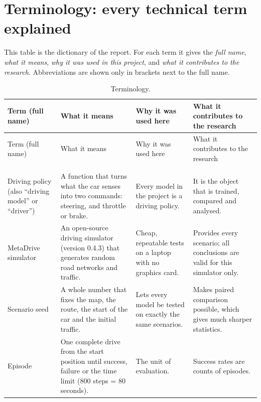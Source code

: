 \section{Terminology: every technical term explained}\label{sec:terminology}

\begin{plainwords}
This table is the dictionary of the report. For each term it gives the \emph{full name}, \emph{what it means}, \emph{why it was used in this project}, and \emph{what it contributes to the research}. Abbreviations are shown only in brackets next to the full name.
\end{plainwords}

{\small
\begin{longtable}{@{}>{\raggedright\arraybackslash}p{3.1cm}>{\raggedright\arraybackslash}p{4.6cm}>{\raggedright\arraybackslash}p{3.7cm}>{\raggedright\arraybackslash}p{4.0cm}@{}}
\caption{Terminology.}\label{tab:terms}\\
\toprule Term (full name) & What it means & Why it was used here & What it contributes to the research\\\midrule\endfirsthead
\toprule Term (full name) & What it means & Why it was used here & What it contributes to the research\\\midrule\endhead
\midrule\multicolumn{4}{r}{\emph{continued on the next page}}\\\endfoot
\bottomrule\endlastfoot
\multicolumn{4}{@{}l}{\textbf{The driving task and the simulator}}\\
Driving policy (also ``driving model'' or ``driver'') & A function that turns what the car senses into two commands: steering, and throttle or brake. & Every model in the project is a driving policy. & It is the object that is trained, compared and analysed.\\
MetaDrive simulator & An open-source driving simulator (version 0.4.3) that generates random road networks and traffic. & Cheap, repeatable tests on a laptop with no graphics card. & Provides every scenario; all conclusions are valid for this simulator only.\\
Scenario seed & A whole number that fixes the map, the route, the start of the car and the initial traffic. & Lets every model be tested on exactly the same scenarios. & Makes paired comparison possible, which gives much sharper statistics.\\
Episode & One complete drive from the start position until success, failure or the time limit (800 steps = 80 seconds). & The unit of evaluation. & Success rates are counts of episodes.\\

\end{longtable}}
